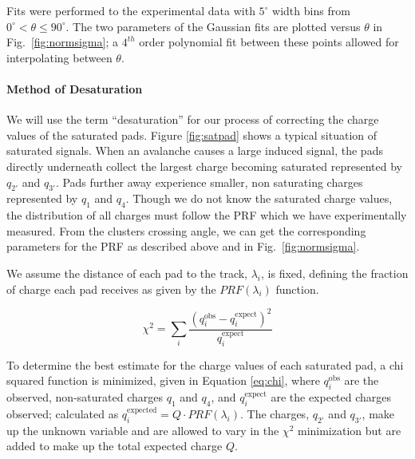 \documentclass[review]{elsarticle}
\begin{document}
Fits were performed to the experimental data with  $5^{\circ}$ width bins from $0^{\circ} < \theta \leq 90^{\circ}$. The two parameters of the Gaussian fits are plotted versus $\theta$ in Fig.~\ref{fig:normsigma}; a $4^{th}$ order polynomial fit between these points allowed for interpolating between $\theta$.

\paragraph{Method of Desaturation}
We will use the term ``desaturation'' for our process of correcting the charge values of the saturated pads. Figure \ref{fig:satpad} shows a typical situation of saturated signals. When an avalanche causes a large induced signal, the pads directly underneath collect the largest charge becoming saturated represented by $q_{2'}$ and $q_{3'}$. Pads further away experience smaller, non saturating charges represented by  $q_{1}$ and $q_{4}$. Though we do not know the saturated charge values, the distribution of all charges must follow the PRF which we have experimentally measured. From the clusters crossing angle, we can get the corresponding parameters for the PRF as described above and in Fig.~\ref{fig:normsigma}.

We assume the distance of each pad to the track, $\lambda_i$, is fixed, defining the fraction of charge each pad receives as given by the $PRF(\lambda_i)$ function. 


\begin{equation}\label{eq:chi}
\chi^2 = \sum_i \frac{(q_i^{\mathrm{obs}} - q_i^{\mathrm{expect}})^2}{q_i^{\mathrm{expect}}}
\end{equation}

To determine the best estimate for the charge values of each saturated pad, a chi squared function is minimized, given in  Equation \ref{eq:chi}, where $q_i^{\mathrm{obs}}$ are the observed, non-saturated charges $q_{1}$ and $q_{4}$, and $q_i^{\mathrm{expect}}$ are the expected charges observed; calculated as $ q_i^{\mathrm{expected}} = Q\cdot PRF(\lambda_i)$. The charges, $q_{2'}$ and $q_{3'}$, make up the unknown variable and are allowed to vary in the $\chi^2$ minimization but are added to make up the total expected charge $Q$.
\end{document}
